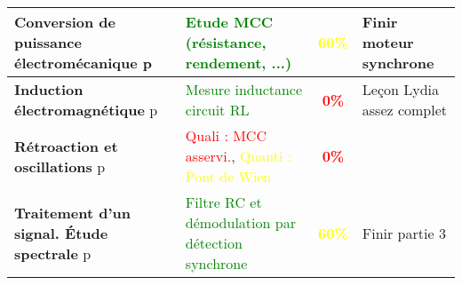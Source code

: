 \begin{changemargin}{-1.5cm}{-0cm}
\begin{center}
\begin{tabularx}{\paperwidth-2cm}{| X | X | c | X |}
  \hline 
  \hline
  \textbf{Conversion de puissance électromécanique} p\pageref{LP_ConversionPuissance} & \textcolor{green}{Etude MCC (résistance, rendement, ...)} & \textcolor{yellow}{\textbf{60\%}} & Finir moteur synchrone\\
  \hline 
  \textbf{Induction électromagnétique} p\pageref{LP_Induction} & \textcolor{green}{Mesure inductance circuit RL} & \textcolor{red}{\textbf{0\%}} & Leçon Lydia assez complet\\
  \hline
  \textbf{Rétroaction et oscillations} p\pageref{LP_RetroactionOscillation} & \textcolor{red}{Quali : MCC asservi.}, \textcolor{yellow}{Quanti : Pont de Wien} & \textcolor{red}{\textbf{0\%}} & \\
  \hline
  \textbf{Traitement d'un signal. Étude spectrale} p\pageref{LP_TraitementSignal} & \textcolor{green}{Filtre RC et démodulation par détection synchrone} & \textcolor{yellow}{\textbf{60\%}} & Finir partie 3\\
  \hline
\end{tabularx}
\end{center}


\end{changemargin}
